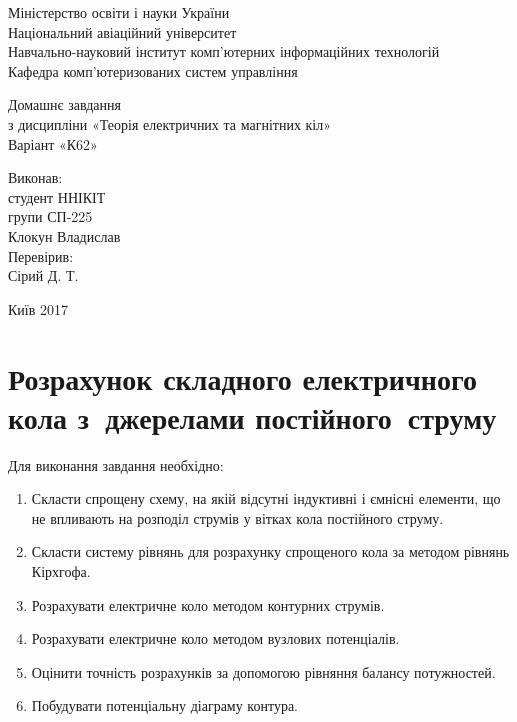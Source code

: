 \documentclass[a4paper,oneside,DIV=12,12pt]{scrartcl}
\begin{document}
	\begin{titlepage}
		\begin{center}
			Міністерство освіти і науки України\\
			Національний авіаційний університет\\
			Навчально-науковий інститут комп'ютерних інформаційних технологій\\
			Кафедра комп'ютеризованих систем управління
			
			\vspace{\fill}
				Домашнє завдання\\
				з дисципліни «Теорія електричних та магнітних кіл»\\
				Варіант «К62»
				
			\vspace{\fill}
			
			\begin{flushright}
				Виконав:\\
				студент ННІКІТ\\
				групи СП-225\\
				Клокун Владислав\\
				Перевірив:\\
				Сірий Д. Т.
			\end{flushright}
			Київ 2017
		\end{center}
	\end{titlepage}
	
	\tableofcontents
	\newpage
	
	\section{Розрахунок складного електричного кола з~джерелами постійного~струму}
		Для виконання завдання необхідно:
		\begin{enumerate}
			\item Скласти спрощену схему, на якій відсутні індуктивні і ємнісні елементи, що не впливають на розподіл струмів у вітках кола постійного струму.
			\item Скласти систему рівнянь для розрахунку спрощеного кола за методом рівнянь Кірхгофа.
			\item Розрахувати електричне коло методом контурних струмів.
			\item Розрахувати електричне коло методом вузлових потенціалів.
			\item Оцінити точність розрахунків за допомогою рівняння балансу потужностей.
			\item Побудувати потенціальну діаграму контура.
		\end{enumerate}
		
\end{document}
